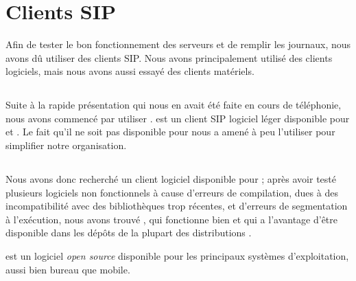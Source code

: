 \section{Clients SIP}

Afin de tester le bon fonctionnement des serveurs et de remplir les journaux, nous avons dû utiliser des clients SIP. Nous avons principalement utilisé des clients logiciels, mais nous avons aussi essayé des clients matériels.

\subsection{\xlite}

Suite à la rapide présentation qui nous en avait été faite en cours de téléphonie, nous avons commencé par utiliser {\xlite}. {\xlite} est un client SIP logiciel léger disponible pour {\win} et {\mac}. Le fait qu’il ne soit pas disponible pour {\lnx} nous a amené à peu l’utiliser pour simplifier notre organisation.


\subsection{\lnp}

Nous avons donc recherché un client logiciel disponible pour {\lnx} ; après avoir testé plusieurs logiciels non fonctionnels à cause d’erreurs de compilation, dues à des incompatibilité avec des bibliothèques trop récentes, et d’erreurs de segmentation à l’exécution, nous avons trouvé {\lnp}, qui fonctionne bien et qui a l’avantage d’être disponible dans les dépôts de la plupart des distributions {\lnx}.


{\lnp} est un logiciel \textit{open source} disponible pour les principaux systèmes d’exploitation, aussi bien bureau que mobile.


\subsection{\cph}


\subsection{\cata}

